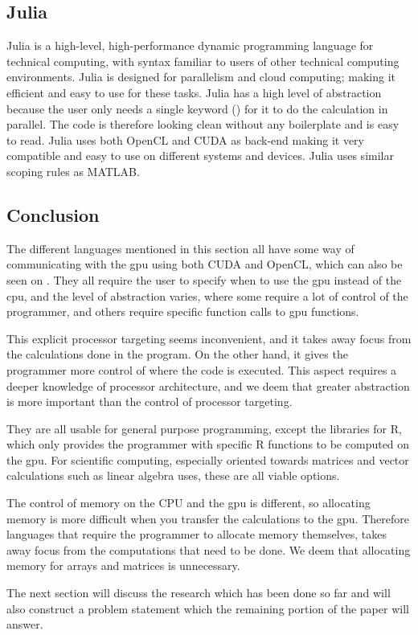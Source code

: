 \subsection{Julia}
Julia is a high-level, high-performance dynamic programming language for technical computing, with syntax familiar to users of other technical computing environments.
Julia is designed for parallelism and cloud computing; making it efficient and easy to use for these tasks.
Julia has a high level of abstraction because the user only needs a single keyword (\@parallel) for it to do the calculation in parallel.
The code is therefore looking clean without any boilerplate and is easy to read.
Julia uses both OpenCL and CUDA as back-end making it very compatible and easy to use on different systems and devices.
Julia uses similar scoping rules as MATLAB.\citep{Julia_Git, Julia_scope,Julia}

 

\subsection{Conclusion}  

The different languages mentioned in this section all have some way of communicating with the \acrshort{gpu} using both CUDA and OpenCL, which can also be seen on .
They all require the user to specify when to use the \acrshort{gpu} instead of the \acrshort{cpu}, and the level of abstraction varies, where some require a lot of control of the programmer, and others require specific function calls to \acrshort{gpu} functions.

This explicit processor targeting seems inconvenient, and it takes away focus from the calculations done in the program.
On the other hand, it gives the programmer more control of where the code is executed.
This aspect requires a deeper knowledge of processor architecture, and we deem that greater abstraction is more important than the control of processor targeting.

They are all usable for general purpose programming, except the libraries for R, which only provides the programmer with specific R functions to be computed on the \acrshort{gpu}.
For scientific computing, especially oriented towards matrices and vector calculations such as linear algebra uses, these are all viable options.

The control of memory on the CPU and the \acrshort{gpu} is different, so allocating memory is more difficult when you transfer the calculations to the \acrshort{gpu}.
Therefore languages that require the programmer to allocate memory themselves, takes away focus from the computations that need to be done.
We deem that allocating memory for arrays and matrices is unnecessary.

The next section will discuss the research which has been done so far and will also construct a problem statement which the remaining portion of the paper will answer.
                     